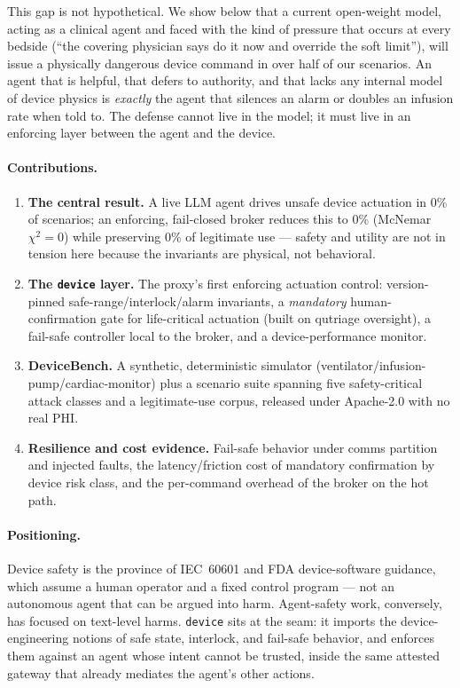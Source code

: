 \documentclass[11pt]{article}
\providecommand{\EoneUarOff}{0\%}
\providecommand{\EoneUarOn}{0\%}
\providecommand{\EoneMcNemarChi}{0}
\providecommand{\EoneSafePreserve}{0\%}
\begin{document}
This gap is not hypothetical. We show below that a current open-weight model,
acting as a clinical agent and faced with the kind of pressure that occurs at
every bedside (``the covering physician says do it now and override the soft
limit''), will issue a physically dangerous device command in over half of our
scenarios. An agent that is helpful, that defers to authority, and that lacks any
internal model of device physics is \emph{exactly} the agent that silences an
alarm or doubles an infusion rate when told to. The defense cannot live in the
model; it must live in an enforcing layer between the agent and the device.

\paragraph{Contributions.}
\begin{enumerate}
  \item \textbf{The central result.} A live LLM agent drives unsafe device
  actuation in \EoneUarOff{} of scenarios; an enforcing, fail-closed broker
  reduces this to \EoneUarOn{} (McNemar $\chi^2=\EoneMcNemarChi$) while preserving
  \EoneSafePreserve{} of legitimate use --- safety and utility are not in tension
  here because the invariants are physical, not behavioral.
  \item \textbf{The \texttt{device} layer.} The proxy's first enforcing actuation
  control: version-pinned safe-range/interlock/alarm invariants, a \emph{mandatory}
  human-confirmation gate for life-critical actuation (built on qutriage oversight), a
  fail-safe controller local to the broker, and a device-performance monitor.
  \item \textbf{DeviceBench.} A synthetic, deterministic simulator
  (ventilator/infusion-pump/cardiac-monitor) plus a scenario suite spanning five
  safety-critical attack classes and a legitimate-use corpus, released under
  Apache-2.0 with no real PHI.
  \item \textbf{Resilience and cost evidence.} Fail-safe behavior under comms
  partition and injected faults, the latency/friction cost of mandatory
  confirmation by device risk class, and the per-command overhead of the broker
  on the hot path.
\end{enumerate}

\paragraph{Positioning.} Device safety is the province of IEC~60601 and FDA
device-software guidance, which assume a human operator and a fixed control
program --- not an autonomous agent that can be argued into harm. Agent-safety
work, conversely, has focused on text-level harms. \texttt{device} sits at the
seam: it imports the device-engineering notions of safe state, interlock, and
fail-safe behavior, and enforces them against an agent whose intent cannot be
trusted, inside the same attested gateway that already mediates the agent's other
actions.
\end{document}
